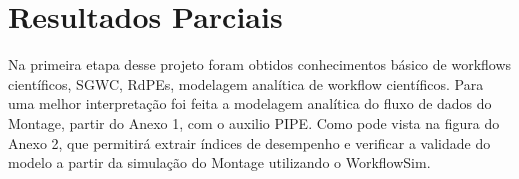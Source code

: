 \section{Resultados Parciais}
	
	Na primeira etapa desse projeto foram obtidos conhecimentos básico de workflows científicos, SGWC, RdPEs, modelagem analítica de workflow científicos. Para uma melhor interpretação foi feita a modelagem analítica do fluxo de dados do Montage, partir do Anexo 1, \cite{pegasus:workflowgenerator} com o auxilio PIPE. Como pode vista na figura do Anexo 2, que permitirá extrair índices de desempenho e verificar a validade do modelo a partir da simulação do Montage utilizando o WorkflowSim.


